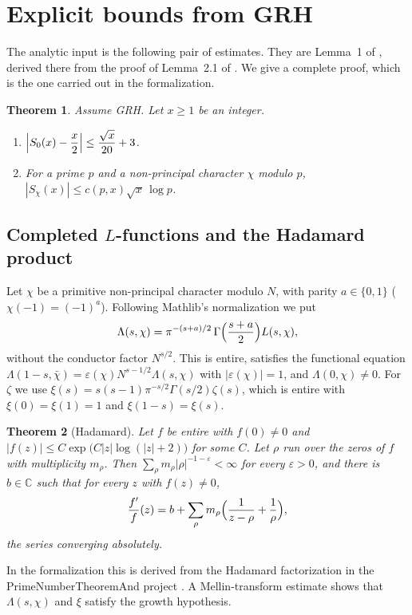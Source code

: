 \documentclass[11pt]{amsart}
\newtheorem{theorem}{Theorem}
\theoremstyle{definition}
\theoremstyle{remark}
\newcommand{\Lam}{\Lambda}
\begin{document}
\section{Explicit bounds from GRH}\label{sec:bach}

The analytic input is the following pair of estimates. They are Lemma~1 of \cite{mtt}, derived there from the proof of Lemma~2.1 of \cite{bach97}. We give a complete proof, which is the one carried out in the formalization.

\begin{theorem}\label{thm:bach}
Assume GRH. Let $x\ge1$ be an integer.
\begin{enumerate}
\item $\displaystyle \Bigl|S_0(x)-\frac x2\Bigr|\le\frac{\sqrt x}{20}+3$.
\item For a prime $p$ and a non-principal character $\chi$ modulo $p$, $\displaystyle |S_\chi(x)|\le c(p,x)\sqrt x\,\log p$.
\end{enumerate}
\end{theorem}

\subsection{Completed $L$-functions and the Hadamard product}

Let $\chi$ be a primitive non-principal character modulo $N$, with parity $a\in\{0,1\}$ ($\chi(-1)=(-1)^a$). Following Mathlib's normalization we put
\[
\Lam(s,\chi)=\pi^{-(s+a)/2}\,\Gamma\Bigl(\frac{s+a}{2}\Bigr)L(s,\chi),
\]
without the conductor factor $N^{s/2}$. This is entire, satisfies the functional equation $\Lam(1-s,\bar\chi)=\varepsilon(\chi)N^{s-1/2}\Lam(s,\chi)$ with $|\varepsilon(\chi)|=1$, and $\Lam(0,\chi)\ne0$. For $\zeta$ we use $\xi(s)=s(s-1)\pi^{-s/2}\Gamma(s/2)\zeta(s)$, which is entire with $\xi(0)=\xi(1)=1$ and $\xi(1-s)=\xi(s)$.

\begin{theorem}[Hadamard]\label{thm:hadamard}
Let $f$ be entire with $f(0)\ne0$ and $|f(z)|\le C\exp\bigl(C|z|\log(|z|+2)\bigr)$ for some $C$. Let $\rho$ run over the zeros of $f$ with multiplicity $m_\rho$. Then $\sum_\rho m_\rho|\rho|^{-1-\varepsilon}<\infty$ for every $\varepsilon>0$, and there is $b\in\mathbb{C}$ such that for every $z$ with $f(z)\ne0$,
\[
\frac{f'}{f}(z)=b+\sum_\rho m_\rho\Bigl(\frac1{z-\rho}+\frac1\rho\Bigr),
\]
the series converging absolutely.
\end{theorem}

In the formalization this is derived from the Hadamard factorization in the PrimeNumberTheoremAnd project \cite{pntplus}. A Mellin-transform estimate shows that $\Lam(s,\chi)$ and $\xi$ satisfy the growth hypothesis.
\end{document}
